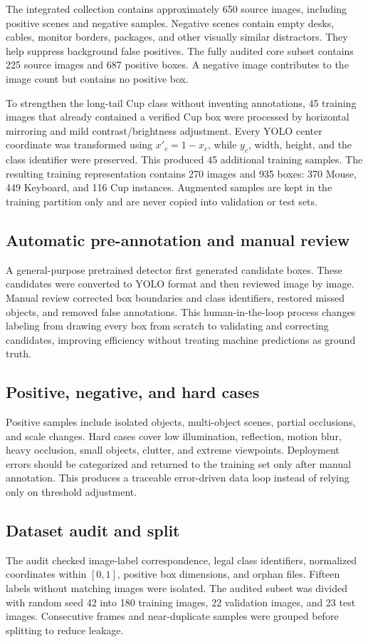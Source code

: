 \documentclass[a4paper,11pt]{article}
\begin{document}
The integrated collection contains approximately 650 source images, including positive scenes and negative samples. Negative scenes contain empty desks, cables, monitor borders, packages, and other visually similar distractors. They help suppress background false positives. The fully audited core subset contains 225 source images and 687 positive boxes. A negative image contributes to the image count but contains no positive box.

To strengthen the long-tail Cup class without inventing annotations, 45 training images that already contained a verified Cup box were processed by horizontal mirroring and mild contrast/brightness adjustment. Every YOLO center coordinate was transformed using $x'_{c}=1-x_{c}$, while $y_c$, width, height, and the class identifier were preserved. This produced 45 additional training samples. The resulting training representation contains 270 images and 935 boxes: 370 Mouse, 449 Keyboard, and 116 Cup instances. Augmented samples are kept in the training partition only and are never copied into validation or test sets.

\subsection{Automatic pre-annotation and manual review}
A general-purpose pretrained detector first generated candidate boxes. These candidates were converted to YOLO format and then reviewed image by image. Manual review corrected box boundaries and class identifiers, restored missed objects, and removed false annotations. This human-in-the-loop process changes labeling from drawing every box from scratch to validating and correcting candidates, improving efficiency without treating machine predictions as ground truth.

\subsection{Positive, negative, and hard cases}
Positive samples include isolated objects, multi-object scenes, partial occlusions, and scale changes. Hard cases cover low illumination, reflection, motion blur, heavy occlusion, small objects, clutter, and extreme viewpoints. Deployment errors should be categorized and returned to the training set only after manual annotation. This produces a traceable error-driven data loop instead of relying only on threshold adjustment.

\subsection{Dataset audit and split}
The audit checked image-label correspondence, legal class identifiers, normalized coordinates within $[0,1]$, positive box dimensions, and orphan files. Fifteen labels without matching images were isolated. The audited subset was divided with random seed 42 into 180 training images, 22 validation images, and 23 test images. Consecutive frames and near-duplicate samples were grouped before splitting to reduce leakage.
\end{document}
